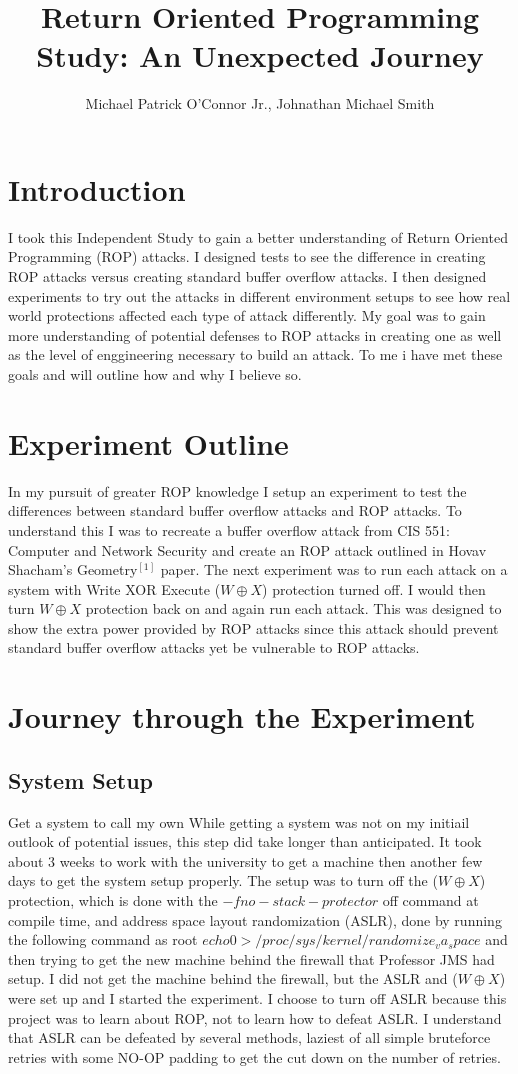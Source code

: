 \documentclass[11pt]{amsart}
\title{Return Oriented Programming Study: \newline An Unexpected Journey}
\author{Michael Patrick O'Connor Jr., Johnathan Michael Smith}
\date{}
\begin{document}
\maketitle

\newpage
\section*{Introduction}
I took this Independent Study to gain a better understanding of Return Oriented Programming (ROP) attacks. I designed tests to see the difference in creating ROP attacks versus creating standard buffer overflow attacks.  I then designed experiments to try out the attacks in different environment setups to see how real world protections affected each type of attack differently.  My goal was to gain more understanding of potential defenses to ROP attacks in creating one as well as the level of enggineering necessary to build an attack.  To me i have met these goals and will outline how and why I believe so.
\section*{Experiment Outline}
In my pursuit of greater ROP knowledge I setup an experiment to test the differences between standard buffer overflow attacks and ROP attacks.  To understand this I was to recreate a buffer overflow attack from CIS 551: Computer and Network Security and create an ROP attack outlined in Hovav Shacham's Geometry$^[1]$ paper.
The next experiment was to run each attack on a system with Write XOR Execute ($W \oplus X$) protection turned off.  I would then turn $W \oplus X$ protection back on and again run each attack.  This was designed to show the extra power provided by ROP attacks since this attack should prevent standard buffer overflow attacks yet be vulnerable to ROP attacks.
\section*{Journey through the Experiment}
\subsection*{System Setup}
Get a system to call my own
While getting a system was not on my initiail outlook of potential issues, this step did take longer than anticipated.  It took about 3 weeks to work with the university to get a machine then another few days to get the system setup properly.  The setup was to turn off the ($W \oplus X$) protection, which is done with the $-fno-stack-protector$ off command at compile time, and address space layout randomization (ASLR), done by running the following command as root $echo 0 > /proc/sys/kernel/randomize_va_space$ and then trying to get the new machine behind the firewall that Professor JMS had setup.  I did not get the machine behind the firewall, but the ASLR and ($W \oplus X$) were set up and I started the experiment.
I choose to turn off ASLR because this project was to learn about ROP, not to learn how to defeat ASLR.  I understand that ASLR can be defeated by several methods, laziest of all simple bruteforce retries with some NO-OP padding to get the cut down on the number of retries.
\end{document}
